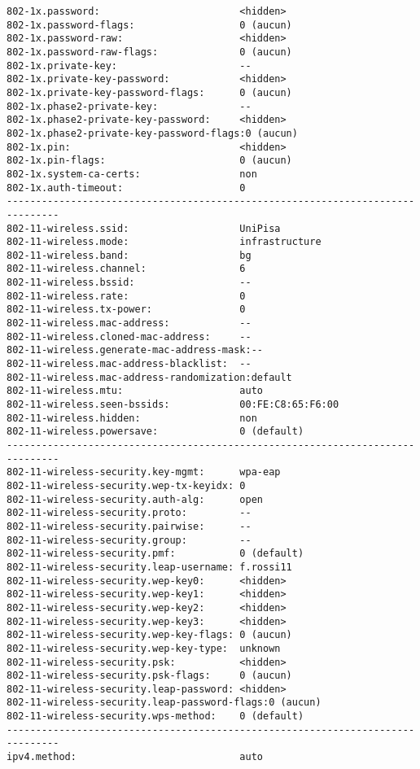 \begin{itemize}
\begin{lstlisting}[basicstyle=\small\ttfamily,columns=flexible,breaklines=true]
802-1x.password:                        <hidden>
802-1x.password-flags:                  0 (aucun)
802-1x.password-raw:                    <hidden>
802-1x.password-raw-flags:              0 (aucun)
802-1x.private-key:                     --
802-1x.private-key-password:            <hidden>
802-1x.private-key-password-flags:      0 (aucun)
802-1x.phase2-private-key:              --
802-1x.phase2-private-key-password:     <hidden>
802-1x.phase2-private-key-password-flags:0 (aucun)
802-1x.pin:                             <hidden>
802-1x.pin-flags:                       0 (aucun)
802-1x.system-ca-certs:                 non
802-1x.auth-timeout:                    0
-------------------------------------------------------------------------------
802-11-wireless.ssid:                   UniPisa
802-11-wireless.mode:                   infrastructure
802-11-wireless.band:                   bg
802-11-wireless.channel:                6
802-11-wireless.bssid:                  --
802-11-wireless.rate:                   0
802-11-wireless.tx-power:               0
802-11-wireless.mac-address:            --
802-11-wireless.cloned-mac-address:     --
802-11-wireless.generate-mac-address-mask:--
802-11-wireless.mac-address-blacklist:  --
802-11-wireless.mac-address-randomization:default
802-11-wireless.mtu:                    auto
802-11-wireless.seen-bssids:            00:FE:C8:65:F6:00
802-11-wireless.hidden:                 non
802-11-wireless.powersave:              0 (default)
-------------------------------------------------------------------------------
802-11-wireless-security.key-mgmt:      wpa-eap
802-11-wireless-security.wep-tx-keyidx: 0
802-11-wireless-security.auth-alg:      open
802-11-wireless-security.proto:         --
802-11-wireless-security.pairwise:      --
802-11-wireless-security.group:         --
802-11-wireless-security.pmf:           0 (default)
802-11-wireless-security.leap-username: f.rossi11
802-11-wireless-security.wep-key0:      <hidden>
802-11-wireless-security.wep-key1:      <hidden>
802-11-wireless-security.wep-key2:      <hidden>
802-11-wireless-security.wep-key3:      <hidden>
802-11-wireless-security.wep-key-flags: 0 (aucun)
802-11-wireless-security.wep-key-type:  unknown
802-11-wireless-security.psk:           <hidden>
802-11-wireless-security.psk-flags:     0 (aucun)
802-11-wireless-security.leap-password: <hidden>
802-11-wireless-security.leap-password-flags:0 (aucun)
802-11-wireless-security.wps-method:    0 (default)
-------------------------------------------------------------------------------
ipv4.method:                            auto

\end{lstlisting}
\end{itemize}

